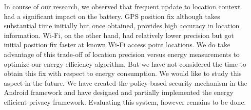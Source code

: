 \documentclass{ubicomp2013}
\begin{document}
In course of our research, we observed that frequent update to location context had a significant impact on the battery. GPS position fix although takes substantial time initially \cite{liu2012gps} but once obtained, provides high accuracy in location information. Wi-Fi, on the other hand, had relatively lower precision but got initial position fix faster at known Wi-Fi access point locations. We do take advantage of this trade-off of location precision versus energy measurements to optimize our energy efficiency algorithm. But we have not considered the time to obtain this fix with respect to energy consumption. We would like to study this aspect in the future. We have created the policy-based security mechanism in the Android framework \cite{ghosh2012ms, ghosh2012privacy} and have designed and partially implemented the energy efficient privacy framework. Evaluating this system, however remains to be done.



\end{document}
